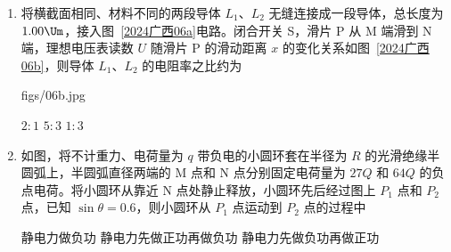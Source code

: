 \documentclass[\gkver]{gaokaozhenti}
\begin{document}
\begin{enumerate}
{根据几何关系可得 P 点至 O 点的距离

$L_{P0} = r + \frac{r}{\cos45^{\circ}} = (1 + \sqrt{2})\frac{mv}{qB}$

故选 C。
}

\item
将横截面相同、材料不同的两段导体 $L_{1}$、$L_{2}$ 无缝连接成一段导体，总长度为 $1.00 \Um$，接入图~\ref{2024广西06a}电路。闭合开关 S，滑片 P 从 M 端滑到 N 端，理想电压表读数 $U$ 随滑片 P 的滑动距离 $x$ 的变化关系如图~\ref{2024广西06b}，则导体 $L_{1}$、$L_{2}$ 的电阻率之比约为

{figs/06b.jpg}

{$2:1$}
{$5:3$}
{$1:3$}


\item
如图，将不计重力、电荷量为 $q$ 带负电的小圆环套在半径为 $R$ 的光滑绝缘半圆弧上，半圆弧直径两端的 M 点和 N 点分别固定电荷量为 $27Q$ 和 $64Q$ 的负点电荷。将小圆环从靠近 N 点处静止释放，小圆环先后经过图上 $P_{1}$ 点和 $P_{2}$ 点，已知 $\sin\theta = 0.6$，则小圆环从 $P_{1}$ 点运动到 $P_{2}$ 点的过程中


{静电力做负功}
{静电力先做正功再做负功}
{静电力先做负功再做正功}

\end{enumerate}
\end{document}
